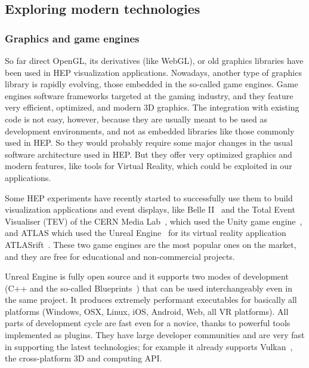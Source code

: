 \documentclass[12pt,a4paper]{article}
\begin{document}
\hypertarget{modern-tech}{%
\subsection{Exploring modern technologies}\label{modern-tech}}

\hypertarget{graphic-engines}{%
\subsubsection{Graphics and game engines}\label{graphic-engines}}

So far direct OpenGL, its derivatives (like WebGL), or old graphics libraries have been used in HEP visualization applications. Nowadays,
another type of graphics library is rapidly evolving, those embedded in the so-called game engines. Game engines software frameworks targeted
at the gaming industry, and they feature very efficient, optimized, and modern 3D graphics.
The integration with existing code is not easy, however, because they are usually meant to be used as development environments,
and not as embedded libraries like those commonly used in HEP. So they would probably require some major changes in the usual
software architecture used in HEP. But they offer very optimized graphics and modern features, like tools for Virtual Reality,
which could be exploited in our applications.

Some HEP experiments have recently started to successfully use them to build visualization applications and event displays,
like Belle II~\cite{BelleIIVR} and the Total Event Visualiser (TEV) of the CERN Media Lab~\cite{CERNTEV},
which used the Unity game engine~\cite{Unity3D}, and ATLAS which used the Unreal Engine~\cite{EpicUnreal} for
its virtual reality application ATLASrift~\cite{ATLASRift}. These two game engines are the most popular ones on the market, and they are
free for educational and non-commercial projects.

Unreal Engine is fully open source and it supports two modes of development (C++ and the so-called Blueprints~\cite{UnrealEngineBlueprints}) that can be used
interchangeably even in the same project. It produces extremely performant executables for basically all platforms
(Windows, OSX, Linux, iOS, Android, Web, all VR platforms). All parts of development cycle are fast even for a novice,
thanks to powerful tools implemented as plugins. They have large developer communities and are very fast in supporting the latest technologies;
for example it already supports Vulkan~\cite{vulkanAPI}, the cross-platform 3D and computing API.
\end{document}

